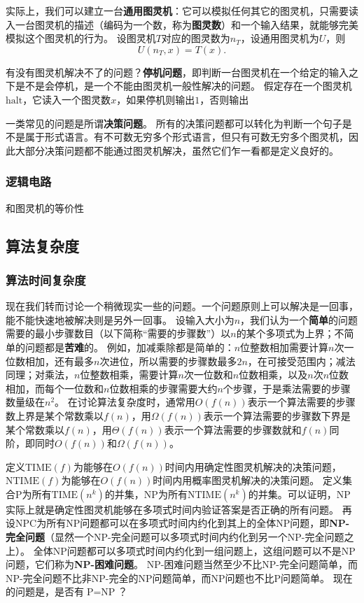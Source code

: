 \documentclass[UTF8, a4paper]{ctexart}
\begin{document}
实际上，我们可以建立一台\textbf{通用图灵机}：它可以模拟任何其它的图灵机，只需要读入一台图灵机的描述（编码为一个数，称为\textbf{图灵数}）和一个输入结果，就能够完美模拟这个图灵机的行为。
设图灵机$T$对应的图灵数为$n_T$，设通用图灵机为$U$，则
\begin{equation}
    U(n_T, x) = T(x).
\end{equation}

有没有图灵机解决不了的问题？\textbf{停机问题}，即判断一台图灵机在一个给定的输入之下是不是会停机，是一个不能由图灵机一般性解决的问题。
假定存在一个图灵机$\text{halt}$，它读入一个图灵数$x$，如果停机则输出$1$，否则输出

一类常见的问题是所谓\textbf{决策问题}。%
所有的决策问题都可以转化为判断一个句子是不是属于形式语言。有不可数无穷多个形式语言，但只有可数无穷多个图灵机，因此大部分决策问题都不能通过图灵机解决，虽然它们乍一看都是定义良好的。

\subsubsection{逻辑电路}

和图灵机的等价性

\subsection{算法复杂度}

\subsubsection{算法时间复杂度}

现在我们转而讨论一个稍微现实一些的问题。一个问题原则上可以解决是一回事，能不能快速地被解决则是另外一回事。
设输入大小为$n$，我们认为一个\textbf{简单}的问题需要的最小步骤数目（以下简称“需要的步骤数”）以$n$的某个多项式为上界；不简单的问题都是\textbf{苦难}的。
例如，加减乘除都是简单的：$n$位整数相加需要计算$n$次一位数相加，还有最多$n$次进位，所以需要的步骤数最多$2n$，在可接受范围内；减法同理；对乘法，$n$位整数相乘，需要计算$n$次一位数和$n$位数相乘，以及$n$次$n$位数相加，而每个一位数和$n$位数相乘的步骤需要大约$n$个步骤，于是乘法需要的步骤数量级在$n^2$。
在讨论算法复杂度时，通常用$O(f(n))$表示一个算法需要的步骤数上界是某个常数乘以$f(n)$，用$\Omega(f(n))$表示一个算法需要的步骤数下界是某个常数乘以$f(n)$，用$\Theta(f(n))$表示一个算法需要的步骤数就和$f(n)$同阶，即同时$O(f(n))$和$\Omega(f(n))$。

定义$\text{TIME}(f)$为能够在$O(f(n))$时间内用确定性图灵机解决的决策问题，$\text{NTIME}(f)$为能够在$O(f(n))$时间内用概率图灵机解决的决策问题。
定义集合$\text{P}$为所有$\text{TIME}(n^k)$的并集，$\text{NP}$为所有$\text{NTIME}(n^k)$的并集。可以证明，$\text{NP}$实际上就是确定性图灵机能够在多项式时间内验证答案是否正确的所有问题。
再设$\text{NPC}$为所有$\text{NP}$问题都可以在多项式时间内约化到其上的全体NP问题，即\textbf{NP-完全问题}（显然一个NP-完全问题可以多项式时间内约化到另一个NP-完全问题之上）。
全体$\text{NP}$问题都可以多项式时间内约化到一组问题上，这组问题可以不是NP问题，它们称为\textbf{NP-困难问题}。
NP-困难问题当然至少不比NP-完全问题简单，而NP-完全问题不比非NP-完全的NP问题简单，而NP问题也不比P问题简单。
现在的问题是，是否有$\text{P}=\text{NP}$？
\end{document}
